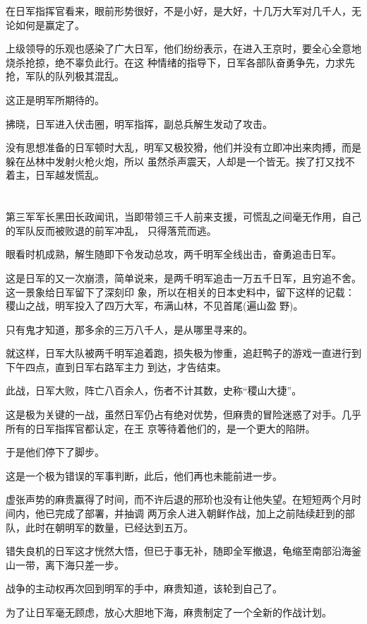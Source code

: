 \documentclass[11pt,a4paper,onecolumn]{article}
\begin{document}
在日军指挥官看来，眼前形势很好，不是小好，是大好，十几万大军对几千人，无论如何是赢定了。

上级领导的乐观也感染了广大日军，他们纷纷表示，在进入王京时，要全心全意地烧杀抢掠，绝不辜负此行。在这
种情绪的指导下，日军各部队奋勇争先，力求先抢，军队的队列极其混乱。

这正是明军所期待的。

拂晓，日军进入伏击圈，明军指挥，副总兵解生发动了攻击。

没有思想准备的日军顿时大乱，明军又极狡猾，他们并没有立即冲出来肉搏，而是躲在丛林中发射火枪火炮，所以
虽然杀声震天，人却是一个皆无。挨了打又找不着主，日军越发慌乱。

\section[\thesection]{}

第三军军长黑田长政闻讯，当即带领三千人前来支援，可慌乱之间毫无作用，自己的军队反而被败退的前军冲乱，
只得落荒而逃。

眼看时机成熟，解生随即下令发动总攻，两千明军全线出击，奋勇追击日军。

这是日军的又一次崩溃，简单说来，是两千明军追击一万五千日军，且穷追不舍。这一景象给日军留下了深刻印
象，所以在相关的日本史料中，留下这样的记载：稷山之战，明军投入了四万大军，布满山林，不见首尾(遍山盈
野)。

只有鬼才知道，那多余的三万八千人，是从哪里寻来的。

就这样，日军大队被两千明军追着跑，损失极为惨重，追赶鸭子的游戏一直进行到下午四点，直到日军右路军主力
到达，才告结束。

此战，日军大败，阵亡八百余人，伤者不计其数，史称``稷山大捷''。

这是极为关键的一战，虽然日军仍占有绝对优势，但麻贵的冒险迷惑了对手。几乎所有的日军指挥官都认定，在王
京等待着他们的，是一个更大的陷阱。

于是他们停下了脚步。

这是一个极为错误的军事判断，此后，他们再也未能前进一步。

虚张声势的麻贵赢得了时间，而不许后退的邢玠也没有让他失望。在短短两个月时间内，他已完成了部署，并抽调
两万余人进入朝鲜作战，加上之前陆续赶到的部队，此时在朝明军的数量，已经达到五万。

错失良机的日军这才恍然大悟，但已于事无补，随即全军撤退，龟缩至南部沿海釜山一带，离下海只差一步。

战争的主动权再次回到明军的手中，麻贵知道，该轮到自己了。

为了让日军毫无顾虑，放心大胆地下海，麻贵制定了一个全新的作战计划。
\end{document}
